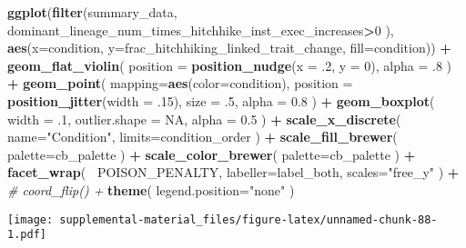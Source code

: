 \documentclass[]{book}
\newenvironment{Shaded}{\begin{snugshade}}{\end{snugshade}}
\newcommand{\CommentTok}[1]{\textcolor[rgb]{0.56,0.35,0.01}{\textit{#1}}}
\newcommand{\DataTypeTok}[1]{\textcolor[rgb]{0.13,0.29,0.53}{#1}}
\newcommand{\DecValTok}[1]{\textcolor[rgb]{0.00,0.00,0.81}{#1}}
\newcommand{\FloatTok}[1]{\textcolor[rgb]{0.00,0.00,0.81}{#1}}
\newcommand{\KeywordTok}[1]{\textcolor[rgb]{0.13,0.29,0.53}{\textbf{#1}}}
\newcommand{\NormalTok}[1]{#1}
\newcommand{\OperatorTok}[1]{\textcolor[rgb]{0.81,0.36,0.00}{\textbf{#1}}}
\newcommand{\OtherTok}[1]{\textcolor[rgb]{0.56,0.35,0.01}{#1}}
\newcommand{\StringTok}[1]{\textcolor[rgb]{0.31,0.60,0.02}{#1}}
\begin{document}
\begin{Shaded}
\begin{Highlighting}[]
\KeywordTok{ggplot}\NormalTok{(}\KeywordTok{filter}\NormalTok{(summary_data, dominant_lineage_num_times_hitchhike_inst_exec_increases}\OperatorTok{>}\DecValTok{0}\NormalTok{ ), }\KeywordTok{aes}\NormalTok{(}\DataTypeTok{x=}\NormalTok{condition, }\DataTypeTok{y=}\NormalTok{frac_hitchhiking_linked_trait_change, }\DataTypeTok{fill=}\NormalTok{condition)) }\OperatorTok{+}
\StringTok{  }\KeywordTok{geom_flat_violin}\NormalTok{(}
    \DataTypeTok{position =} \KeywordTok{position_nudge}\NormalTok{(}\DataTypeTok{x =} \FloatTok{.2}\NormalTok{, }\DataTypeTok{y =} \DecValTok{0}\NormalTok{),}
    \DataTypeTok{alpha =} \FloatTok{.8}
\NormalTok{  ) }\OperatorTok{+}
\StringTok{  }\KeywordTok{geom_point}\NormalTok{(}
    \DataTypeTok{mapping=}\KeywordTok{aes}\NormalTok{(}\DataTypeTok{color=}\NormalTok{condition),}
    \DataTypeTok{position =} \KeywordTok{position_jitter}\NormalTok{(}\DataTypeTok{width =} \FloatTok{.15}\NormalTok{),}
    \DataTypeTok{size =} \FloatTok{.5}\NormalTok{,}
    \DataTypeTok{alpha =} \FloatTok{0.8}
\NormalTok{  ) }\OperatorTok{+}
\StringTok{  }\KeywordTok{geom_boxplot}\NormalTok{(}
    \DataTypeTok{width =} \FloatTok{.1}\NormalTok{,}
    \DataTypeTok{outlier.shape =} \OtherTok{NA}\NormalTok{,}
    \DataTypeTok{alpha =} \FloatTok{0.5}
\NormalTok{  ) }\OperatorTok{+}
\StringTok{  }\KeywordTok{scale_x_discrete}\NormalTok{(}
    \DataTypeTok{name=}\StringTok{"Condition"}\NormalTok{,}
    \DataTypeTok{limits=}\NormalTok{condition_order}
\NormalTok{  ) }\OperatorTok{+}
\StringTok{  }\KeywordTok{scale_fill_brewer}\NormalTok{(}
    \DataTypeTok{palette=}\NormalTok{cb_palette}
\NormalTok{  ) }\OperatorTok{+}
\StringTok{  }\KeywordTok{scale_color_brewer}\NormalTok{(}
    \DataTypeTok{palette=}\NormalTok{cb_palette}
\NormalTok{  ) }\OperatorTok{+}
\StringTok{  }\KeywordTok{facet_wrap}\NormalTok{(}
    \OperatorTok{~}\NormalTok{POISON_PENALTY,}
    \DataTypeTok{labeller=}\NormalTok{label_both,}
    \DataTypeTok{scales=}\StringTok{"free_y"}
\NormalTok{  ) }\OperatorTok{+}
\StringTok{  }\CommentTok{# coord_flip() +}
\StringTok{  }\KeywordTok{theme}\NormalTok{(}
    \DataTypeTok{legend.position=}\StringTok{"none"}
\NormalTok{  )}
\end{Highlighting}
\end{Shaded}

\texttt{[image: supplemental-material\_files/figure-latex/unnamed-chunk-88-1.pdf]}
\end{document}
